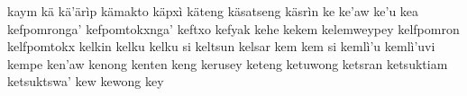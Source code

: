 kaym\hspace{2mm}
kä\hspace{2mm}
kä'ärìp\hspace{2mm}
kämakto\hspace{2mm}
käpxì\hspace{2mm}
käteng\hspace{2mm}
käsatseng\hspace{2mm}
käsrìn\hspace{2mm}
ke\hspace{2mm}
ke'aw\hspace{2mm}
ke'u\hspace{2mm}
kea\hspace{2mm}
kefpomronga'\hspace{2mm}
kefpomtokxnga'\hspace{2mm}
keftxo\hspace{2mm}
kefyak\hspace{2mm}
kehe\hspace{2mm}
kekem\hspace{2mm}
kelemweypey\hspace{2mm}
kelfpomron\hspace{2mm}
kelfpomtokx\hspace{2mm}
kelkin\hspace{2mm}
kelku\hspace{2mm}
kelku si\hspace{2mm}
keltsun\hspace{2mm}
kelsar\hspace{2mm}
kem\hspace{2mm}
kem si\hspace{2mm}
kemlì'u\hspace{2mm}
kemlì'uvi\hspace{2mm}
kempe\hspace{2mm}
ken'aw\hspace{2mm}
kenong\hspace{2mm}
kenten\hspace{2mm}
keng\hspace{2mm}
kerusey\hspace{2mm}
keteng\hspace{2mm}
ketuwong\hspace{2mm}
ketsran\hspace{2mm}
ketsuktiam\hspace{2mm}
ketsuktswa'\hspace{2mm}
kew\hspace{2mm}
kewong\hspace{2mm}
key\hspace{2mm}
